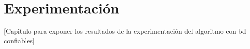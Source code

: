 \chapter{Experimentaci\'on}\label{chapter:RESULTS}

[Capitulo para exponer los resultados de la experimentaci\'on del algoritmo con bd confiables]